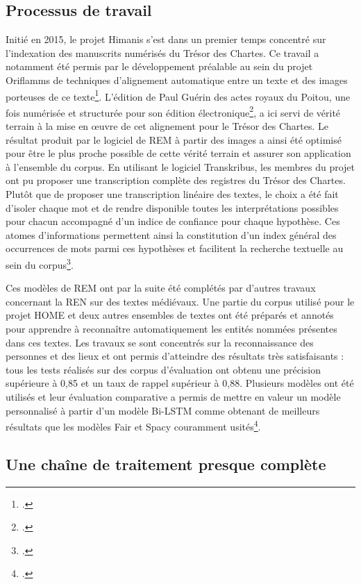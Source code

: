 \documentclass[a4paper,12pt,twoside]{book}
\begin{document}
	\subsection{Processus de travail}
	
	Initié en 2015, le projet Himanis s'est dans un premier temps concentré sur l'indexation des manuscrits numérisés du Trésor des Chartes. Ce travail a notamment été permis par le développement préalable au sein du projet Oriflamms de techniques d'alignement automatique entre un texte et des images porteuses de ce texte\footcite{bluche_automatic_2016}. L'édition de Paul Guérin des actes royaux du Poitou, une fois numérisée et structurée pour son édition électronique\footcite{guerin_actes_1881}, a ici servi de vérité terrain à la mise en œuvre de cet alignement pour le Trésor des Chartes. Le résultat produit par le logiciel de REM à partir des images a ainsi été optimisé pour être le plus proche possible de cette vérité terrain et assurer son application à l'ensemble du corpus. En utilisant le logiciel Transkribus, les membres du projet ont pu proposer une transcription complète des registres du Trésor des Chartes. Plutôt que de proposer une transcription linéaire des textes, le choix a été fait d'isoler chaque mot et de rendre disponible toutes les interprétations possibles pour chacun accompagné d'un indice de confiance pour chaque hypothèse. Ces atomes d'informations permettent ainsi la constitution d'un index général des occurrences de mots parmi ces hypothèses et facilitent la recherche textuelle au sein du corpus\footcite{stutzmann_recherche_2017}.
	
	Ces modèles de REM ont par la suite été complétés par d'autres travaux concernant la REN sur des textes médiévaux. Une partie du corpus utilisé pour le projet HOME et deux autres ensembles de textes ont été préparés et annotés pour apprendre à reconnaître automatiquement les entités nommées présentes dans ces textes. Les travaux se sont concentrés sur la reconnaissance des personnes et des lieux et ont permis d'atteindre des résultats très satisfaisants : tous les tests réalisés sur des corpus d'évaluation ont obtenu une précision supérieure à 0,85 et un taux de rappel supérieur à 0,88. Plusieurs modèles ont été utilisés et leur évaluation comparative a permis de mettre en valeur un modèle personnalisé à partir d'un modèle Bi-LSTM comme obtenant de meilleurs résultats que les modèles Fair et Spacy couramment usités\footcite{torres_aguilar_named_2021}.
	
	\subsection{Une chaîne de traitement presque complète}
	
\end{document}
